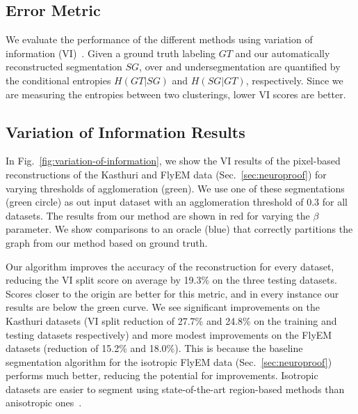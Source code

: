 
\subsection{Error Metric}
\label{sec:variation-of-information}

We evaluate the performance of the different methods using variation of information (VI)~\cite{meila2003comparing}.
Given a ground truth labeling $GT$ and our automatically reconstructed segmentation $SG$, over and undersegmentation are quantified by the conditional entropies $H(GT | SG)$ and $H(SG | GT)$, respectively. Since we are measuring the entropies between two clusterings, lower VI scores are better.

\subsection{Variation of Information Results}

In Fig.~\ref{fig:variation-of-information}, we show the VI results of the pixel-based reconstructions of the Kasthuri and FlyEM data (Sec.~\ref{sec:neuroproof}) for varying thresholds of agglomeration (green). We use one of these segmentations (green circle) as out input dataset with an agglomeration threshold of 0.3 for all datasets. The results from our method are shown in red for varying the $\beta$ parameter. We show comparisons to an oracle (blue) that correctly partitions the graph from our method based on ground truth.

Our algorithm improves the accuracy of the reconstruction for every dataset, reducing the VI split score on average by 19.3\% on the three testing datasets. 
Scores closer to the origin are better for this metric, and in every instance our results are below the green curve.
We see significant improvements on the Kasthuri datasets (VI split reduction of 27.7\% and 24.8\% on the training and testing datasets respectively) and more modest improvements on the FlyEM datasets (reduction of 15.2\% and 18.0\%). This is because the baseline segmentation algorithm for the isotropic FlyEM data (Sec.~\ref{sec:neuroproof}) performs much better, reducing the potential for improvements. Isotropic datasets are easier to segment using state-of-the-art region-based methods than anisotropic ones~\cite{plaza2014annotating}.

